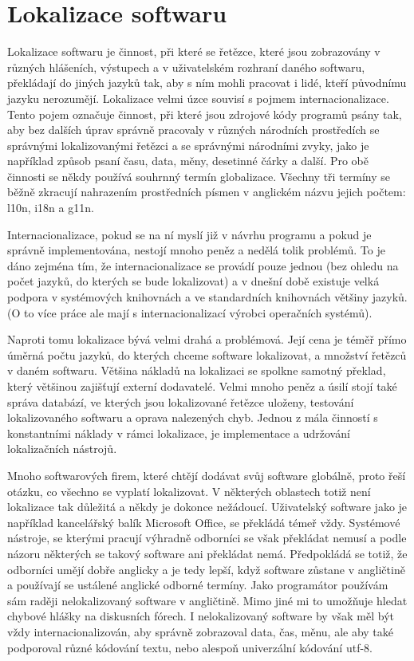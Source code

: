 \documentclass[12pt,a4paper]{report}
\begin{document}
\section*{Lokalizace softwaru}

Lokalizace softwaru je činnost, při které se řetězce, které jsou zobrazovány v
různých hlášeních, výstupech a v uživatelském rozhraní daného softwaru,
překládají do jiných jazyků tak, aby s ním mohli pracovat i lidé, kteří
původnímu jazyku nerozumějí. Lokalizace velmi úzce souvisí s pojmem
internacionalizace.  Tento pojem označuje činnost, při které jsou  zdrojové
kódy programů psány tak, aby bez dalších úprav správně pracovaly v různých
národních prostředích se správnými lokalizovanými řetězci a se správnými
národními zvyky, jako je například způsob psaní času, data, měny, desetinné
čárky a další. Pro obě činnosti se někdy používá souhrnný termín globalizace.
Všechny tři termíny se běžně zkracují nahrazením prostředních písmen v
anglickém názvu jejich počtem: l10n, i18n a g11n.

Internacionalizace, pokud se na ní myslí již v návrhu programu a pokud je
správně implementována, nestojí mnoho peněz a nedělá tolik problémů. To je dáno
zejména tím, že internacionalizace se provádí pouze jednou (bez ohledu na počet
jazyků, do kterých se bude lokalizovat) a v dnešní době existuje velká podpora
v systémových knihovnách a ve standardních knihovnách většiny jazyků. (O to
více práce ale mají s internacionalizací výrobci operačních systémů).

Naproti tomu lokalizace bývá velmi drahá a problémová. Její cena je téměř přímo
úměrná počtu jazyků, do kterých chceme software lokalizovat, a množství řetězců
v daném softwaru. Většina nákladů na lokalizaci se spolkne samotný překlad,
který většinou zajišťují externí dodavatelé. Velmi mnoho peněz a úsilí
stojí také správa databází, ve kterých jsou lokalizované řetězce uloženy, testování
lokalizovaného softwaru a oprava nalezených chyb. Jednou z mála činností s
konstantními náklady v rámci lokalizace, je implementace a udržování
lokalizačních nástrojů. 

Mnoho softwarových firem, které chtějí dodávat svůj software globálně, proto
řeší otázku, co všechno se vyplatí lokalizovat. V některých oblastech totiž
není lokalizace tak důležitá a někdy je dokonce nežádoucí. Uživatelský software
jako je například kancelářský balík Microsoft Office, se překládá témeř vždy.
Systémové nástroje, se kterými pracují výhradně odborníci se však překládat
nemusí a podle názoru některých se takový software ani překládat nemá.
Předpokládá se totiž, že odborníci umějí dobře anglicky a je tedy lepší, když
software zůstane v angličtině a používají se ustálené anglické odborné termíny.
Jako programátor používám sám raději nelokalizovaný software v angličtině. Mimo
jiné mi to umožňuje hledat chybové hlášky na diskusních fórech. I
nelokalizovaný software by však měl být vždy internacionalizován, aby správně
zobrazoval data, čas, měnu, ale aby také podporoval různé kódování textu, nebo
alespoň univerzální kódování utf-8.
\end{document}
